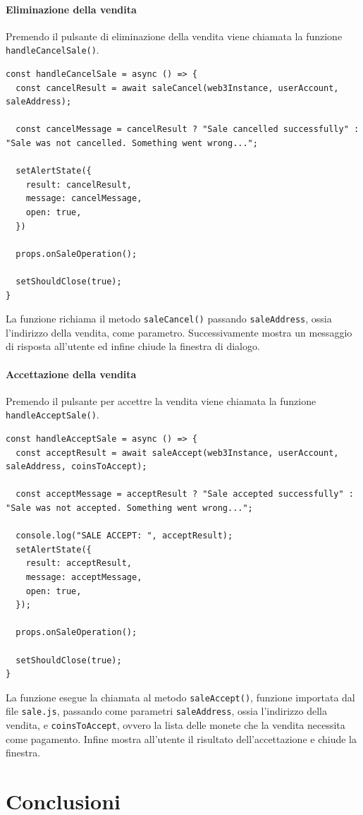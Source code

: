 \documentclass[a4paper]{article}
\begin{document}
        \paragraph{Eliminazione della vendita}
        Premendo il pulsante di eliminazione della vendita viene chiamata la funzione \verb|handleCancelSale()|.
\begin{lstlisting}[style=ES6, title={Funzione handleCancelSale()}]
const handleCancelSale = async () => {
  const cancelResult = await saleCancel(web3Instance, userAccount, saleAddress);

  const cancelMessage = cancelResult ? "Sale cancelled successfully" : "Sale was not cancelled. Something went wrong...";

  setAlertState({
    result: cancelResult,
    message: cancelMessage,
    open: true,
  })

  props.onSaleOperation();

  setShouldClose(true);
}\end{lstlisting}
        La funzione richiama il metodo \verb|saleCancel()| passando \verb|saleAddress|, ossia l'indirizzo della vendita, come parametro. Successivamente mostra un messaggio di risposta all'utente ed infine chiude la finestra di dialogo.
        \paragraph{Accettazione della vendita}
        Premendo il pulsante per accettre la vendita viene chiamata la funzione \verb|handleAcceptSale()|.
\begin{lstlisting}[style=ES6, title={Funzione handleAcceptSale()}]
const handleAcceptSale = async () => {
  const acceptResult = await saleAccept(web3Instance, userAccount, saleAddress, coinsToAccept);

  const acceptMessage = acceptResult ? "Sale accepted successfully" : "Sale was not accepted. Something went wrong...";

  console.log("SALE ACCEPT: ", acceptResult);
  setAlertState({
    result: acceptResult,
    message: acceptMessage,
    open: true,
  });

  props.onSaleOperation();

  setShouldClose(true);
}\end{lstlisting}
        La funzione esegue la chiamata al metodo \verb|saleAccept()|, funzione importata dal file \verb|sale.js|, passando come parametri \verb|saleAddress|, ossia l'indirizzo della vendita, e \verb|coinsToAccept|, ovvero la lista delle monete che la vendita necessita come pagamento.
        Infine mostra all'utente il risultato dell'accettazione e chiude la finestra.

        \newpage
        \section{Conclusioni}
        \newpage
        \printbibliography
\end{document}
